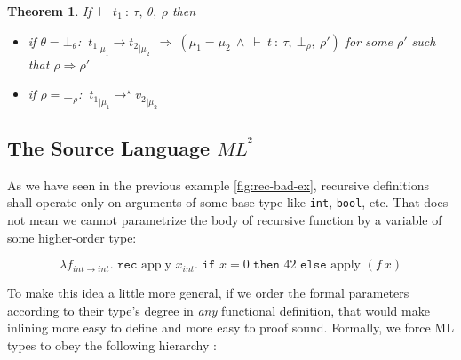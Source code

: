 \documentclass[a4paper,11pt,oneside]{article}
\theoremstyle{plain}
\newtheorem{theorem}[definition]{Theorem}
\newcommand{\bwedge}{\boldsymbol{~\wedge~}}
\newcommand{\brarr}{\boldsymbol{~\Rightarrow~}}
\newcommand{\typing}[4]{\vdash~#1~:~#2,~#3,~#4}
\newcommand{\bth}{\bot_\theta}
\newcommand{\brh}{\bot_\rho}
\newcommand{\evalstep}[4]{~#1_{|\mu_#2} \rightarrow #3_{|\mu_#4} ~}
\newcommand{\evalstar}[4]{~#1_{|\mu_#2} \rightarrow^{\star} #3_{|\mu_#4} ~}
\newcommand{\inlsrc}{\textit{ML}^{^2}}
\begin{document}
\vspace*{-0.2cm}
\begin{theorem}
 If $\typing{t_1}{\tau}{\theta}{\rho}$ then 
 \begin{itemize}
 \item[$\bullet$] if $\theta = \bth$:
    $\evalstep{t{_1}}{1}{t{_2}}{2} \brarr (\mu_1 = \mu_2 \bwedge 
  \typing{t}{\tau}{\brh}{\rho'})$ for some $\rho'$ such that $\rho \Rightarrow \rho'$ 
 \item[$\bullet$] if $\rho = \brh $: $\evalstar{t{_1}}{1}{v{_2}}{2}$

 
 \end{itemize}
 
\end{theorem}



\subsection{The Source Language \texorpdfstring{$\inlsrc$}{}}

As we have seen in the previous example \ref{fig:rec-bad-ex}, recursive definitions shall
operate only on arguments of some base type like \texttt{int}, \texttt{bool},
etc. That does not mean we cannot parametrize the body of recursive function by
a variable of some higher-order type:
\begin{footnotesize}
$$ \lambda f_{int \rightarrow int}. \texttt{ rec } \text{apply } x_{int} .
  \texttt{ if } x = 0 \texttt{ then } 42 \texttt{ else} \text{ apply } (f~x)$$
\end{footnotesize}
To make this idea a little more general, if we order the formal
parameters according to their type's degree in \textit{any} functional
definition, that would make inlining more easy to define 
and more easy to proof sound. 
Formally, we force ML types to obey the following hierarchy :
\end{document}
